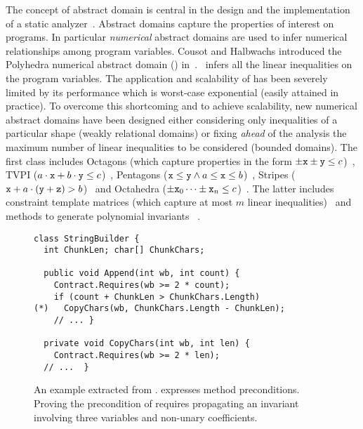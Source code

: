 \documentclass{llncs}
\begin{document}
The concept of abstract domain is central in the design and the implementation of a static analyzer~\cite{CousotCousot77}.
Abstract domains capture the properties of interest on programs.
In particular \emph{numerical} abstract domains are used to infer numerical relationships among program variables.
Cousot and Halbwachs introduced the Polyhedra numerical abstract domain (\Polyhedra) in~\cite{CousotHalbwachs78}.
\Polyhedra\  infers all the linear inequalities on the program variables.
The application and scalability of \Polyhedra{} has been severely limited by its performance which is worst-case exponential (easily attained in practice).
To overcome this shortcoming and to achieve scalability, new numerical abstract domains have been designed either  considering  only inequalities of a particular shape (weakly relational domains) or fixing \emph{ahead} of the analysis the maximum number of linear inequalities to be considered (bounded domains).
The first class includes Octagons (which capture properties in the form $\pm \mathtt{x} \pm \mathtt{y} \leq c$)~\cite{Mine01-2}, TVPI ($a \cdot \mathtt{x} + b \cdot \mathtt{y} \leq c$)~\cite{SimonKing02-2}, Pentagons ($\mathtt{x} \leq \mathtt{y} \wedge a \leq \mathtt{x} \leq b$)~\cite{LogozzoMaf08}, Stripes ($\mathtt{x} + a \cdot (\mathtt{y} + \mathtt{z}) > b$)~\cite{FerraraLogozzoMaf08} and Octahedra ($\pm \mathtt{x}_0 \dots \pm \mathtt{x}_n \leq c$)~\cite{ClarisoCortadella04}.
The latter includes constraint template matrices (which capture at most $m$ linear inequalities)~\cite{Sankaranarayanan05} and  methods to generate polynomial invariants \eg~\cite{MullerSeidl04-2,CarbonellKapur07}.

\begin{figure}[t]
{
\small
\begin{Verbatim}
class StringBuilder {
  int ChunkLen; char[] ChunkChars;
  
  public void Append(int wb, int count) {
    Contract.Requires(wb >= 2 * count); 
    if (count + ChunkLen > ChunkChars.Length)        
(*)   CopyChars(wb, ChunkChars.Length - ChunkLen);
    // ... }
  
  private void CopyChars(int wb, int len) {
    Contract.Requires(wb >= 2 * len); 
  // ...  }
\end{Verbatim}
}
\vspace{-0.2cm}
\caption{An example extracted from .  expresses method preconditions. Proving the precondition of  requires propagating an invariant involving three variables and non-unary coefficients.}
\label{fig:ex_vance}
\vspace{-0.2cm}
\end{figure}
\end{document}
